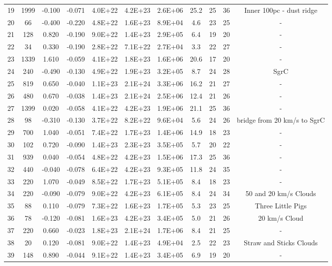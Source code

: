 \begin{tabular}{ccccccccccc}
19 & 1999 & -0.100 & -0.071 & 4.0E+22 & 4.2E+23 & 2.6E+06 & 25.2 & 25 & 36 & Inner 100pc - dust ridge \\
20 & 66 & -0.400 & -0.220 & 4.8E+22 & 1.6E+23 & 8.9E+04 & 4.6 & 23 & 25 & - \\
21 & 128 & 0.820 & -0.190 & 9.0E+22 & 1.4E+23 & 2.9E+05 & 6.4 & 19 & 20 & - \\
22 & 34 & 0.330 & -0.190 & 2.8E+22 & 7.1E+22 & 2.7E+04 & 3.3 & 22 & 27 & - \\
23 & 1339 & 1.610 & -0.059 & 4.1E+22 & 1.8E+23 & 1.6E+06 & 20.6 & 17 & 20 & - \\
24 & 240 & -0.490 & -0.130 & 4.9E+22 & 1.9E+23 & 3.2E+05 & 8.7 & 24 & 28 & SgrC \\
25 & 819 & 0.650 & -0.040 & 1.1E+23 & 2.1E+24 & 3.3E+06 & 16.2 & 21 & 27 & - \\
26 & 480 & 0.670 & -0.038 & 1.4E+23 & 2.1E+24 & 2.5E+06 & 12.4 & 21 & 26 & - \\
27 & 1399 & 0.020 & -0.058 & 4.1E+22 & 4.2E+23 & 1.9E+06 & 21.1 & 25 & 36 & - \\
28 & 98 & -0.310 & -0.130 & 3.7E+22 & 8.2E+22 & 9.6E+04 & 5.6 & 24 & 26 & bridge from 20 km/s to SgrC \\
29 & 700 & 1.040 & -0.051 & 7.4E+22 & 1.7E+23 & 1.4E+06 & 14.9 & 18 & 23 & - \\
30 & 102 & 0.720 & -0.090 & 1.4E+23 & 2.3E+23 & 3.5E+05 & 5.7 & 20 & 22 & - \\
31 & 939 & 0.040 & -0.054 & 4.8E+22 & 4.2E+23 & 1.5E+06 & 17.3 & 25 & 36 & - \\
32 & 440 & -0.040 & -0.078 & 6.4E+22 & 4.2E+23 & 9.3E+05 & 11.8 & 24 & 35 & - \\
33 & 220 & 1.070 & -0.049 & 8.5E+22 & 1.7E+23 & 5.1E+05 & 8.4 & 18 & 23 & - \\
34 & 220 & -0.090 & -0.079 & 9.0E+22 & 4.2E+23 & 6.1E+05 & 8.4 & 24 & 34 & 50 and 20 km/s Clouds \\
35 & 88 & 0.110 & -0.079 & 7.3E+22 & 1.6E+23 & 1.7E+05 & 5.3 & 23 & 25 & Three Little Pigs \\
36 & 78 & -0.120 & -0.081 & 1.6E+23 & 4.2E+23 & 3.4E+05 & 5.0 & 21 & 26 & 20 km/s Cloud \\
37 & 220 & 0.660 & -0.023 & 1.8E+23 & 2.1E+24 & 1.7E+06 & 8.4 & 21 & 25 & - \\
38 & 20 & 0.120 & -0.081 & 9.0E+22 & 1.4E+23 & 4.9E+04 & 2.5 & 22 & 23 & Straw and Sticks Clouds \\
39 & 148 & 0.890 & -0.044 & 9.1E+22 & 1.4E+23 & 3.4E+05 & 6.9 & 19 & 20 & - \\

\end{tabular}
